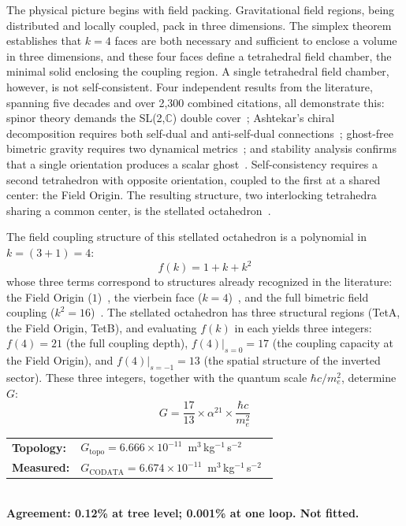 \documentclass[aps,prd,preprint,superscriptaddress,showpacs,preprintnumbers,amsmath,amssymb,nofootinbib]{revtex4-2}
\begin{document}
The physical picture begins with field packing. Gravitational field regions, being distributed and locally coupled, pack in three dimensions. The simplex theorem establishes that $k = 4$ faces are both necessary and sufficient to enclose a volume in three dimensions, and these four faces define a tetrahedral field chamber, the minimal solid enclosing the coupling region. A single tetrahedral field chamber, however, is not self-consistent. Four independent results from the literature, spanning five decades and over 2,300 combined citations, all demonstrate this: spinor theory demands the SL(2,$\mathbb{C}$) double cover~\cite{weinberg1995,geroch1968}; Ashtekar's chiral decomposition requires both self-dual and anti-self-dual connections~\cite{ashtekar1986}; ghost-free bimetric gravity requires two dynamical metrics~\cite{hassan2012}; and stability analysis confirms that a single orientation produces a scalar ghost~\cite{alexander2014}. Self-consistency requires a second tetrahedron with opposite orientation, coupled to the first at a shared center: the Field Origin. The resulting structure, two interlocking tetrahedra sharing a common center, is the stellated octahedron~\cite{coxeter1973}.

The field coupling structure of this stellated octahedron is a polynomial in $k = (3{+}1) = 4$:
\begin{equation}
f(k) = 1 + k + k^2
\end{equation}
whose three terms correspond to structures already recognized in the literature: the Field Origin ($1$)~\cite{hinterbichler2012}, the vierbein face ($k = 4$)~\cite{mtw1973}, and the full bimetric field coupling ($k^2 = 16$)~\cite{hassan2012}. The stellated octahedron has three structural regions (TetA, the Field Origin, TetB), and evaluating $f(k)$ in each yields three integers: $f(4) = 21$ (the full coupling depth), $f(4)|_{s=0} = 17$ (the coupling capacity at the Field Origin), and $f(4)|_{s=-1} = 13$ (the spatial structure of the inverted sector). These three integers, together with the quantum scale $\hbar c / m_e^2$, determine $G$:
\begin{equation}
G = \frac{17}{13} \times \alpha^{21} \times \frac{\hbar c}{m_e^2}
\label{eq:G}
\end{equation}
\begin{center}
\renewcommand{\arraystretch}{1.3}
\begin{tabular}{@{}ll@{}}
\textbf{Topology:} & $G_{\text{topo}} = 6.666 \times 10^{-11}$~m$^3$\,kg$^{-1}$\,s$^{-2}$ \\
\textbf{Measured:} & $G_{\text{CODATA}} = 6.674 \times 10^{-11}$~m$^3$\,kg$^{-1}$\,s$^{-2}$~\cite{codata2022} \\
\end{tabular}\\[4pt]
\textbf{Agreement: 0.12\% at tree level; 0.001\% at one loop. Not fitted.}
\end{center}
\end{document}
